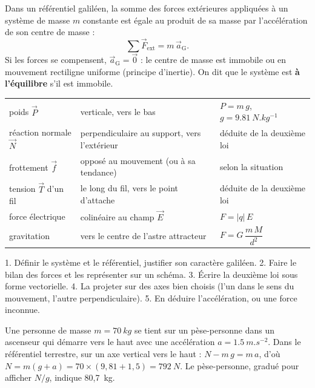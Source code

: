 \begin{loi}
Dans un référentiel galiléen, la somme des forces extérieures appliquées à un système de masse $m$ constante est égale
au produit de sa masse par l'accélération de son centre de masse :
\[\sum\vec{F}_\text{ext}=m\,\vec{a}_\mathrm{G}.\]
Si les forces se compensent, $\vec{a}_\mathrm{G}=\vec{0}$ : le centre de masse est immobile ou en mouvement rectiligne
uniforme (principe d'inertie). On dit que le système est \textbf{à l'équilibre} s'il est immobile.
\end{loi}
\begin{propriete}
\par\smallskip
{\small\renewcommand{\arraystretch}{1.3}
\begin{tabularx}{\linewidth}{@{}lYl@{}}\toprule
{} &  & \\\midrule
poids $\vec{P}$ & verticale, vers le bas & $P=m\,g$, $g=\qty{9,81}{N.kg^{-1}}$\\
réaction normale $\vec{N}$ & perpendiculaire au support, vers l'extérieur & déduite de la deuxième loi\\
frottement $\vec{f}$ & opposé au mouvement (ou à sa tendance) & selon la situation\\
tension $\vec{T}$ d'un fil & le long du fil, vers le point d'attache & déduite de la deuxième loi\\
force électrique & colinéaire au champ $\vec{E}$ & $F=|q|\,E$\\
gravitation & vers le centre de l'astre attracteur & $F=G\,\dfrac{m\,M}{d^2}$\\\bottomrule
\end{tabularx}}
\end{propriete}
\begin{savoirfaire}
1. Définir le système et le référentiel, justifier son caractère galiléen. 2. Faire le bilan des forces et les
représenter sur un schéma. 3. Écrire la deuxième loi sous forme vectorielle. 4. La projeter sur des axes bien choisis
(l'un dans le sens du mouvement, l'autre perpendiculaire). 5. En déduire l'accélération, ou une force inconnue.
\end{savoirfaire}
\begin{exemple}
Une personne de masse $m=\qty{70}{kg}$ se tient sur un pèse-personne dans un ascenseur qui démarre vers le haut avec
une accélération $a=\qty{1,5}{m.s^{-2}}$. Dans le référentiel terrestre, sur un axe vertical vers le haut :
$N-m\,g=m\,a$, d'où $N=m(g+a)=70\times(9{,}81+1{,}5)=\qty{792}{N}$. Le pèse-personne, gradué pour afficher $N/g$,
indique 80,7~kg.
\end{exemple}
